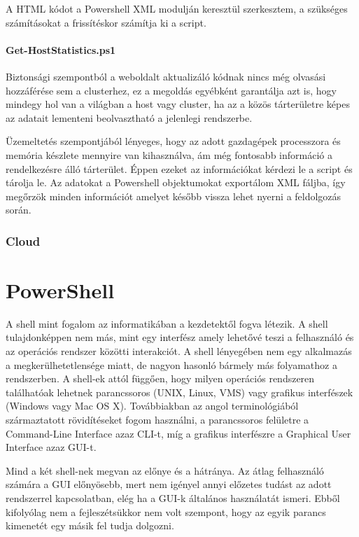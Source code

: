 \documentclass[12pt,oneside,justify,table]{book}
\begin{document}
A HTML kódot a Powershell XML modulján keresztül szerkesztem, a szükséges számításokat a frissítéskor számítja ki a script.

\subsubsection{Get-HostStatistics.ps1}
Biztonsági szempontból a weboldalt aktualizáló kódnak nincs még olvasási hozzáférése sem a clusterhez, ez a megoldás egyébként garantálja azt is, hogy mindegy hol van a világban a host vagy cluster, ha az a közös tárterületre képes az adatait lementeni beolvasztható a jelenlegi rendszerbe. 

Üzemeltetés szempontjából lényeges, hogy az adott gazdagépek processzora és memória készlete mennyire van kihasználva, ám még fontosabb információ a rendelkezésre álló tárterület. Éppen ezeket az információkat kérdezi le a script és tárolja le. Az adatokat a Powershell objektumokat exportálom XML fáljba, így megőrzök minden információt amelyet később vissza lehet nyerni a feldolgozás során.

\subsection{Cloud}
\noindent

\chapter{PowerShell}
A shell mint fogalom az informatikában a kezdetektől fogva létezik. A shell tulajdonképpen nem más, mint egy interfész amely lehetővé teszi a felhasználó és az operációs rendszer közötti interakciót. A shell lényegében nem egy alkalmazás a megkerülhetetlensége miatt, de nagyon hasonló bármely más folyamathoz a rendszerben. A shell-ek attól függően, hogy milyen operációs rendszeren találhatóak lehetnek parancssoros (UNIX, Linux, VMS) vagy grafikus interfészek (Windows vagy Mac OS X). Továbbiakban az angol terminológiából származtatott rövidítéseket fogom használni, a parancssoros felületre a Command-Line Interface azaz CLI-t, míg a grafikus interfészre a Graphical User Interface azaz GUI-t.

Mind a két shell-nek megvan az előnye és a hátránya. Az átlag felhasználó számára a GUI előnyösebb, mert nem igényel annyi előzetes tudást az adott rendszerrel kapcsolatban, elég ha a GUI-k általános használatát ismeri. Ebből kifolyólag nem a fejleszétsükkor nem volt szempont, hogy az egyik parancs kimenetét egy másik fel tudja dolgozni. 
\end{document}
